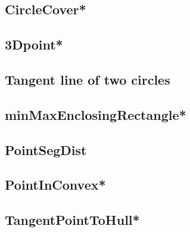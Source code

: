 \subsection{CircleCover*} %

\subsection{3Dpoint*} %

% 
% 
% 
\subsection{Tangent line of two circles}

\subsection{minMaxEnclosingRectangle*} %

\subsection{PointSegDist}

\subsection{PointInConvex*} %

\subsection{TangentPointToHull*} %


